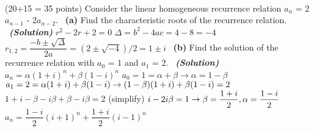\documentclass[a4 paper]{article}
\numberwithin{equation}{section}
\newcommand{\problem}[2]{~\\\fbox{\textbf{Problem #1}}\hfill (#2 points)\newline\newline}
\newcommand{\subproblem}[1]{~\newline\textbf{(#1)}}
\newcommand{\solution}{~\newline\textbf{\textit{(Solution)}} }
\newcommand{\0}{\mathbf{0}}
\begin{document}
\problem{3}{20+15 = 35}
Consider the linear homogeneous recurrence relation $a_n$ = 2$a_{n-1}$ - 2$a_{n-2}$.
\subproblem{a} Find the characteristic roots of the recurrence relation.
\solution\newline
$r^2-2r+2=0$\newline
$\Delta=b^2-4ac=4-8=-4$\newline
$r_{1,2}=\dfrac{-b\pm \sqrt{\Delta}}{2a} = (2\pm\sqrt{-4})/2 = 1\pm i$
\newline
\subproblem{b} Find the solution of the recurrence relation with $a_0$ = 1 and $a_1$ = 2.
\solution\newline
$a_n=\alpha(1+i)^n + \beta(1-i)^n$\newline
$a_0=1=\alpha + \beta\rightarrow\alpha=1-\beta$\newline
$a_1=2=\alpha(1+i) + \beta(1-i)\rightarrow(1-\beta)(1+i) + \beta(1-i)=2\newline$
$1+i-\beta-i\beta+\beta-i\beta=2$ (simplify)\newline
$i-2i\beta=1\rightarrow\beta=\dfrac{1+i}{2},\alpha=\dfrac{1-i}{2}\newline$
$a_n=\dfrac{1-i}{2}(i+1)^n + \dfrac{1+i}{2}(i-1)^n$
\end{document}
